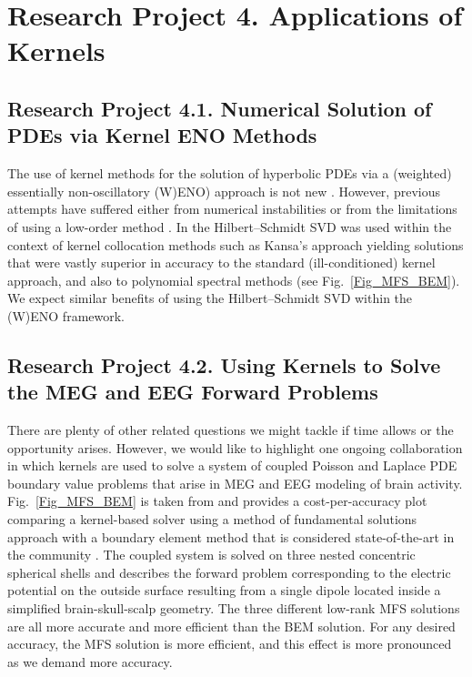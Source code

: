 \documentclass[11pt]{NSFamsart}
\begin{document}
\section*{Research Project 4. Applications of Kernels}
\label{appsec}
\subsection{Research Project 4.1. Numerical Solution of PDEs via Kernel ENO Methods}  \label{PDEsubsec}
The use of kernel methods for the solution of hyperbolic PDEs via a (weighted) essentially non-oscillatory (W)ENO) approach is not new \citep{CecilEtAl04,IskeSonar96}. However, previous attempts have suffered either from numerical instabilities \citep{CecilEtAl04} or from the limitations of using a low-order method \citep{IskeSonar96}. In \citep{McCourt13} the Hilbert--Schmidt SVD was used within the context of kernel collocation methods such as Kansa's approach \citep{Fas07a} yielding solutions that were vastly superior in accuracy to the standard (ill-conditioned) kernel approach, and also to polynomial spectral methods (see Fig.~\ref{Fig_MFS_BEM}). We expect similar benefits of using the Hilbert--Schmidt SVD within the (W)ENO framework.

\subsection{Research Project 4.2. Using Kernels to Solve the MEG and EEG Forward Problems} \label{SectMEEG}
There are plenty of other related questions we might tackle if time allows or the opportunity arises. However, we would like to highlight one ongoing collaboration in which kernels are used to solve a system of coupled Poisson and Laplace PDE boundary value problems that arise in MEG and EEG modeling of brain activity. Fig.~\ref{Fig_MFS_BEM} is taken from \citep{AFFGM13} and provides a cost-per-accuracy plot comparing a kernel-based solver using a method of fundamental solutions approach with a boundary element method that is considered state-of-the-art in the community \citep{fieldtrip11}. The coupled system is solved on three nested concentric spherical shells and describes the forward problem corresponding to the electric potential on the outside surface resulting from a single dipole located inside a simplified brain-skull-scalp geometry. The three different low-rank MFS solutions are all more accurate and more efficient than the BEM solution. For any desired accuracy, the MFS solution is more efficient, and this effect is more pronounced as we demand more accuracy.
\end{document}
